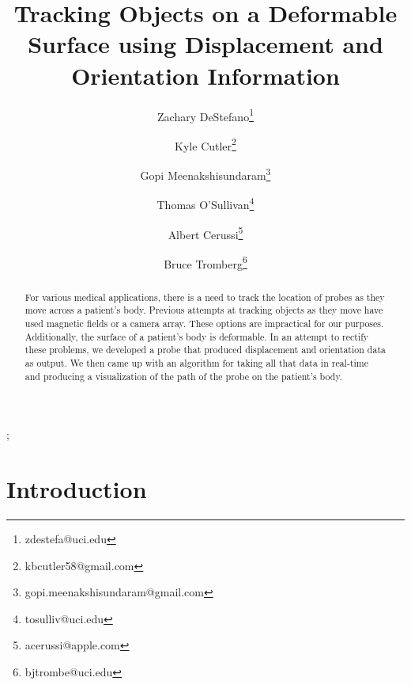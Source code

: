 \documentclass[conference]{acmsiggraph}
\title{Tracking Objects on a Deformable Surface using Displacement and Orientation Information}
\author[1]{Zachary DeStefano\thanks{zdestefa@uci.edu}}
\author[1]{Kyle Cutler\thanks{kbcutler58@gmail.com}}
\author[1]{Gopi Meenakshisundaram\thanks{gopi.meenakshisundaram@gmail.com}}
\author[1]{Thomas O'Sullivan\thanks{tosulliv@uci.edu}}
\author[1]{Albert Cerussi\thanks{acerussi@apple.com}}
\author[1]{Bruce Tromberg\thanks{bjtrombe@uci.edu}}
\affil[1]{University of California, Irvine}
\begin{document}

\maketitle

\begin{abstract}

For various medical applications, there is a need to track the location of probes as they move across a patient's body. Previous attempts at tracking objects as they move have used magnetic fields or a camera array. These options are impractical for our purposes. Additionally, the surface of a patient's body is deformable. In an attempt to rectify these problems, we developed a probe that produced displacement and orientation data as output. We then came up with an algorithm for taking all that data in real-time and producing a visualization of the path of the probe on the patient's body. 

\end{abstract}

\begin{CRcatlist}
  ;
\end{CRcatlist}

\keywordlist


\TOGlinkslist


\copyrightspace

\section{Introduction}
\end{document}
